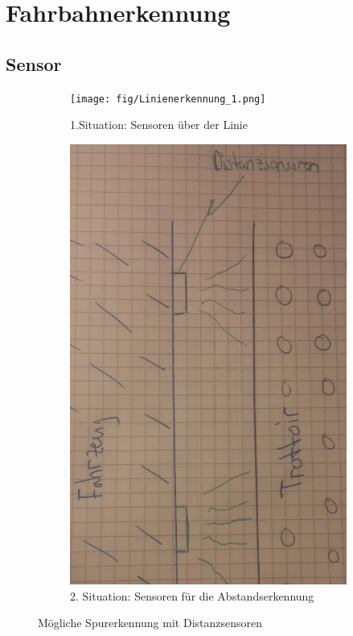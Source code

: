 
\section{Fahrbahnerkennung}


\subsection{Sensor}

\begin{figure} [hbp]
	\centering
	\begin{subfigure}[b]{0.39\textwidth}
		\texttt{[image: fig/Linienerkennung\_1.png]}
		\caption{1.Situation: Sensoren über der Linie}
	\end{subfigure}
	\hfill
	\begin{subfigure}[b]{0.35\textwidth}
		\includegraphics[width=\textwidth]{fig/Trottoirerkennung_1.png}
		\caption{2. Situation: Sensoren für die Abstandserkennung}
\end{subfigure}
	\caption{Mögliche Spurerkennung mit Distanzsensoren}\label{fig:SpurerkennungSensoren}
\end{figure}



